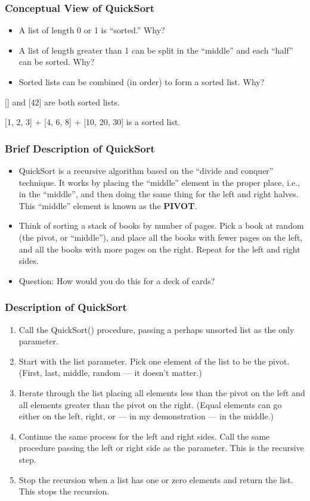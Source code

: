 \documentclass{beamer}
\begin{document}
    \begin{frame}
        \frametitle{Conceptual View of QuickSort}
        \begin{itemize}
            \item A list of length 0 or 1 is ``sorted.'' Why?
            \item A list of length greater than 1 can be split in the ``middle'' and each ``half'' can be sorted. Why?
            \item Sorted lists can be combined (in order) to form a sorted list. Why?
        \end{itemize}
        \par \Large [] and [42] are both sorted lists.
        \par \Large [1, 2, 3] + [4, 6, 8] + [10, 20, 30] is a sorted list.
    \end{frame}

    \begin{frame}
        \frametitle{Brief Description of QuickSort}
        \begin{itemize}
            \item QuickSort is a recursive algorithm based on the ``divide and conquer'' technique. It works by placing the ``middle'' element in the proper place, i.e., in the ``middle'', and then doing the same thing for the left and right halves. This ``middle'' element is known as the \textbf{PIVOT}.
            \item Think of sorting a stack of books by number of pages. Pick a book at random (the pivot, or ``middle''), and place all the books with fewer pages on the left, and all the books with more pages on the right. Repeat for the left and right sides.
            \item Question: How would you do this for a deck of cards?
        \end{itemize}
    \end{frame}

    \begin{frame}
        \frametitle{Description of QuickSort}
        \begin{enumerate}
            \item Call the QuickSort() procedure, passing a perhaps unsorted list as the only parameter.
            \item Start with the list parameter. Pick one element of the list to be the pivot. (First, last, middle, random --- it doesn't matter.)
            \item Iterate through the list placing all elements less than the pivot on the left and all elements greater than the pivot on the right. (Equal elements can go either on the left, right, or --- in my demonstration --- in the middle.)
            \item Continue the same process for the left and right sides. Call the same procedure passing the left or right side as the parameter. This is the recursive step.
            \item Stop the recursion when a list has one or zero elements and return the list. This stops the recursion.
        \end{enumerate}
    \end{frame}
\end{document}
